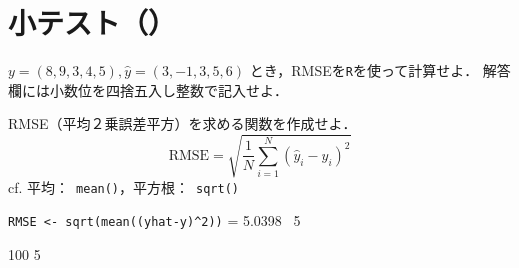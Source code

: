 \newcommand{\Release}{}
\newcommand{\Slide}{}
\newcommand{\PrintLecture}{1}
\newcommand{\PrintSolution}{0}







\maketitle

\section{小テスト（\MyClass）}

\begin{quiz}{\MyClass}

\QuizShortAnswer
{
  $y = (8, 9, 3, 4, 5), \hat{y} = (3, -1, 3, 5, 6)$
  とき，RMSEを\texttt{R}を使って計算せよ．
  解答欄には小数位を四捨五入し整数で記入せよ．
}
{
  RMSE（平均２乗誤差平方）を求める関数を作成せよ．
  \vspace{-2mm}
  \[
    \mathrm{RMSE}=\sqrt{\frac{1}{N}\sum_{i=1}^{N}(\hat{y}_i-y_i)^2}
  \]
  cf. 平均：~\texttt{mean()}，平方根：~\texttt{sqrt()}

  \texttt{RMSE <- sqrt(mean((yhat-y)\textasciicircum 2))}
  = 5.0398 \simeq~5
}
{100}
{5}
{}
{}
{}

\end{quiz}


